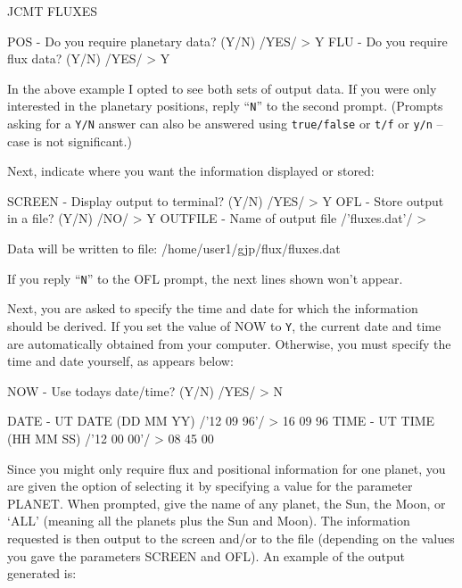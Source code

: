 \documentclass[11pt,twoside]{starlink}
\begin{document}
\begin{terminalv}
JCMT FLUXES

POS - Do you require planetary data? (Y/N) /YES/ > Y
FLU - Do you require flux data?      (Y/N) /YES/ > Y
\end{terminalv}

In the above example I opted to see both sets of output data.
If you were only interested in the planetary positions, reply ``\texttt{N}''
to the second prompt.
(Prompts asking for a \texttt{Y/N} answer can also be answered using
\texttt{true/false} or \texttt{t/f} or \texttt{y/n} --
case is not significant.)

Next, indicate where you want the information displayed or stored:

\begin{terminalv}
SCREEN - Display output to terminal? (Y/N) /YES/ > Y
OFL - Store output in a file?        (Y/N) /NO/ > Y
OUTFILE - Name of output file /'fluxes.dat'/ >

Data will be written to file: /home/user1/gjp/flux/fluxes.dat
\end{terminalv}

If you reply ``\texttt{N}'' to the OFL prompt, the next lines shown won't appear.

Next, you are asked to specify the time and date for which the information
should be derived.
If you set the value of NOW to \texttt{Y}, the current date
and time are automatically obtained from your computer.
Otherwise, you must specify the time and date yourself, as appears below:

\begin{terminalv}
NOW - Use todays date/time? (Y/N) /YES/ > N

DATE - UT DATE (DD MM YY) /'12 09 96'/ > 16 09 96
TIME - UT TIME (HH MM SS) /'12 00 00'/ > 08 45 00
\end{terminalv}

Since you might only require flux and positional information for one planet,
you are given the option of selecting it by specifying a value for the
parameter PLANET.
When prompted, give the name of any planet, the Sun, the Moon,
or `ALL' (meaning all the planets plus the Sun and Moon).
The information requested is then output to the screen and/or to the file
(depending on the values you gave the parameters SCREEN and OFL).
An example of the output generated is:
\end{document}
